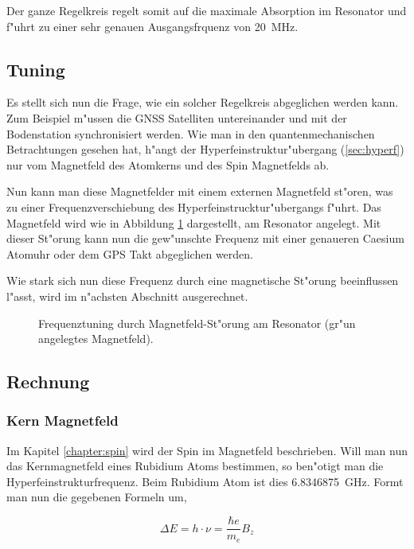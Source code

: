 \begin{refsection}
Der ganze Regelkreis regelt somit auf die maximale Absorption im
Resonator und f"uhrt zu einer sehr genauen Ausgangsfrquenz von
\SI{20}{\mega\hertz}.

\subsection{Tuning}
Es stellt sich nun die Frage, wie ein solcher Regelkreis abgeglichen
werden kann.  Zum Beispiel m"ussen die GNSS Satelliten untereinander
und mit der Bodenstation synchronisiert werden.  Wie man in den
quantenmechanischen Betrachtungen gesehen hat, h"angt der
Hyperfeinstruktur"ubergang (\ref{sec:hyperf}) nur vom Magnetfeld des
Atomkerns und des Spin Magnetfelds ab.

Nun kann man diese Magnetfelder mit einem externen Magnetfeld st"oren,
was zu einer Frequenzverschiebung des Hyperfeinstrucktur"ubergangs
f"uhrt.  Das Magnetfeld wird wie in Abbildung \ref{fig:tuning}
dargestellt, am Resonator angelegt.  Mit dieser St"orung kann nun die
gew"unschte Frequenz mit einer genaueren Caesium Atomuhr oder dem GPS
Takt abgeglichen werden.

Wie stark sich nun diese Frequenz durch eine magnetische St"orung
beeinflussen l"asst, wird im n"achsten Abschnitt ausgerechnet.

\begin{figure}
  \centering
  
  \caption{Frequenztuning durch Magnetfeld-St"orung am Resonator
    (gr"un angelegtes Magnetfeld).}
  \label{fig:tuning}
\end{figure}

\subsection{Rechnung}

\subsubsection{Kern Magnetfeld}
Im Kapitel \ref{chapter:spin} wird der Spin im Magnetfeld beschrieben.
Will man nun das Kernmagnetfeld eines Rubidium Atoms bestimmen, so
ben"otigt man die Hyperfeinstrukturfrequenz.  Beim Rubidium Atom ist
dies \SI{6.8346875}{\giga\hertz}.  Formt man nun die gegebenen Formeln
um,

\begin{equation*}
  \Delta E = h\cdot\nu = \dfrac{\hbar e}{m_e}B_z
\end{equation*}


\end{refsection}
